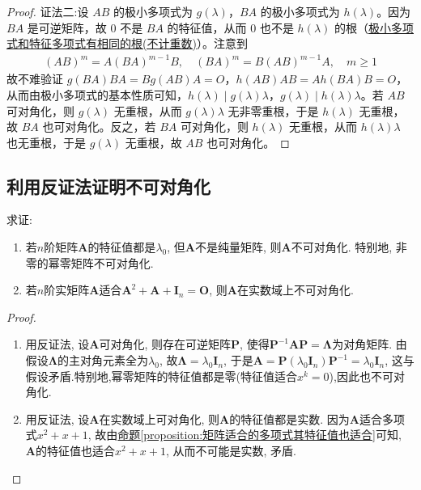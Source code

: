 \documentclass[../../main.tex]{subfiles}
\begin{document}
\begin{proof}
{\color{blue}证法二:}设 $AB$ 的极小多项式为 $g(\lambda)$，$BA$ 的极小多项式为 $h(\lambda)$。因为 $BA$ 是可逆矩阵，故 $0$ 不是 $BA$ 的特征值，从而 $0$ 也不是 $h(\lambda)$ 的根（\hyperref[corollary:极小多项式和特征多项式有相同的根(不计重数)]{极小多项式和特征多项式有相同的根(不计重数)}）。注意到
\begin{align*}
(AB)^m = A(BA)^{m - 1}B, \quad (BA)^m = B(AB)^{m - 1}A, \quad m\geq 1
\end{align*}
故不难验证 $g(BA)BA = Bg(AB)A = O$，$h(AB)AB = Ah(BA)B = O$，从而由极小多项式的基本性质可知，$h(\lambda)\mid g(\lambda)\lambda$，$g(\lambda)\mid h(\lambda)\lambda$。若 $AB$ 可对角化，则 $g(\lambda)$ 无重根，从而 $g(\lambda)\lambda$ 无非零重根，于是 $h(\lambda)$ 无重根，故 $BA$ 也可对角化。反之，若 $BA$ 可对角化，则 $h(\lambda)$ 无重根，从而 $h(\lambda)\lambda$ 也无重根，于是 $g(\lambda)$ 无重根，故 $AB$ 也可对角化。
\end{proof}

\subsection{利用反证法证明不可对角化}

\begin{example}\label{example-0.10}
求证:
\begin{enumerate}[(1)]
\item 若\(n\)阶矩阵\(\boldsymbol{A}\)的特征值都是\(\lambda_0\), 但\(\boldsymbol{A}\)不是纯量矩阵, 则\(\boldsymbol{A}\)不可对角化. 特别地, 非零的幂零矩阵不可对角化.

\item 若\(n\)阶实矩阵\(\boldsymbol{A}\)适合\(\boldsymbol{A}^2 + \boldsymbol{A} + \boldsymbol{I}_n = \boldsymbol{O}\), 则\(\boldsymbol{A}\)在实数域上不可对角化.
\end{enumerate}
\end{example}
\begin{proof}
\begin{enumerate}[(1)]
\item 用反证法, 设\(\boldsymbol{A}\)可对角化, 则存在可逆矩阵\(\boldsymbol{P}\), 使得\(\boldsymbol{P}^{-1}\boldsymbol{A}\boldsymbol{P} = \boldsymbol{\Lambda}\)为对角矩阵. 由假设\(\boldsymbol{\Lambda}\)的主对角元素全为\(\lambda_0\), 故\(\boldsymbol{\Lambda} = \lambda_0\boldsymbol{I}_n\), 于是\(\boldsymbol{A} = \boldsymbol{P}(\lambda_0\boldsymbol{I}_n)\boldsymbol{P}^{-1} = \lambda_0\boldsymbol{I}_n\), 这与假设矛盾.特别地,幂零矩阵的特征值都是零(特征值适合$x^k=0$),因此也不可对角化.

\item 用反证法, 设\(\boldsymbol{A}\)在实数域上可对角化, 则\(\boldsymbol{A}\)的特征值都是实数. 因为\(\boldsymbol{A}\)适合多项式\(x^2 + x + 1\), 故由\hyperref[proposition:矩阵适合的多项式其特征值也适合]{命题\ref{proposition:矩阵适合的多项式其特征值也适合}}可知, \(\boldsymbol{A}\)的特征值也适合\(x^2 + x + 1\), 从而不可能是实数, 矛盾.
\end{enumerate}
\end{proof}
\end{document}
